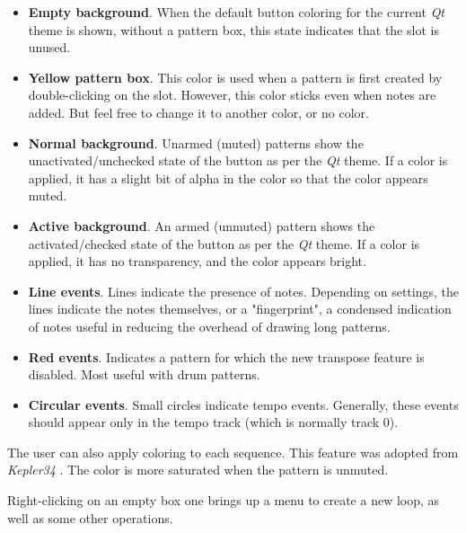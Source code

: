   \begin{itemize}
      \item \textbf{Empty background}.
         When the default button coloring for
         the current \textsl{Qt} theme is shown, without a pattern box,
         this state indicates that the slot is unused.
      \item \textbf{Yellow pattern box}.
         This color is used when a pattern is
         first created by double-clicking on the slot.
         However, this color sticks even when notes are added.
         But feel free to change it to another color, or no color.
      \item \textbf{Normal background}.
         Unarmed (muted) patterns show the
         unactivated/unchecked state of the button as per the \textsl{Qt}
         theme.  If a color is applied, it has a slight bit of alpha in the
         color so that the color appears muted.
      \item \textbf{Active background}.
         An armed (unmuted) pattern shows the
         activated/checked state of the button as per the \textsl{Qt}
         theme.  If a color is applied, it has no transparency, and the 
         color appears bright.
      \item \textbf{Line events}.
         Lines indicate the presence of notes.  Depending on settings, the
         lines indicate the notes themselves, or a "fingerprint", a condensed
         indication of notes useful in reducing the overhead of
         drawing long patterns.
      \item \textbf{Red events}.
         Indicates a pattern for which the new transpose feature is
         disabled.  Most useful with drum patterns.
      \item \textbf{Circular events}.
         Small circles indicate tempo events.  Generally, these events should
         appear only in the tempo track (which is normally track 0).
   \end{itemize}

   The user can also apply coloring to each sequence.
   This feature was adopted from \textsl{Kepler34} \cite{kepler34}.
   The color is more saturated when the pattern is unmuted.

   Right-clicking on an empty box one brings up a menu to create
   a new loop, as well as some other operations.

